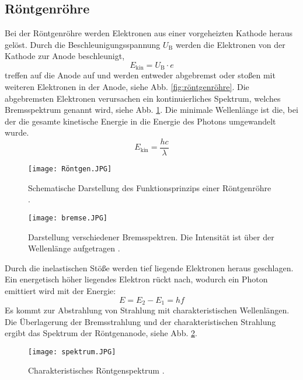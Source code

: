 \subsection{Röntgenröhre}
Bei der Röntgenröhre werden Elektronen aus einer vorgeheizten Kathode heraus gelöst. Durch die Beschleunigungsspannung $U_\text{B}$ werden die Elektronen von der Kathode zur Anode beschleunigt,
\begin{equation*}E_\text{kin} = U_\text{B} \cdot e\end{equation*}
treffen auf die Anode auf und werden entweder abgebremst oder stoßen mit weiteren Elektronen in der Anode, siehe Abb. \ref{fig:röntgenröhre}.
Die abgebremsten Elektronen verursachen ein kontinuierliches Spektrum, welches Bremsspektrum genannt wird, siehe Abb. \ref{fig:bremsspektrum}. Die minimale Wellenlänge ist die, bei der die gesamte kinetische Energie in die Energie des Photons umgewandelt wurde.
\begin{equation*}E_\text{kin} = \frac{hc}{\lambda}\end{equation*}
\begin{figure}[H]
\begin{minipage}{0.5\textwidth}
    \centering
    \texttt{[image: Röntgen.JPG]}
    \caption[Funktionsprinzip Röntgenröhre]{Schematische Darstellung des Funktionsprinzips einer Röntgenröhre \cite{demtroder3}.}
    \label{fig:röntgenröhre}
\end{minipage}\hfill
\begin{minipage}{0.5\textwidth}
    \centering
    \texttt{[image: bremse.JPG]}
    \caption[Bremsspektren]{Darstellung verschiedener Bremsspektren. Die Intensität ist über der Wellenlänge aufgetragen \cite{demtroder3}.}
    \label{fig:bremsspektrum}
\end{minipage}
\end{figure}
Durch die inelastischen Stöße werden tief liegende Elektronen heraus geschlagen. Ein energetisch höher liegendes Elektron rückt nach, wodurch ein Photon emittiert wird mit der Energie:
\begin{equation*}E = E_2 - E_1 = hf\end{equation*}
Es kommt zur Abstrahlung von Strahlung mit charakteristischen Wellenlängen. Die Überlagerung der Bremsstrahlung und der charakteristischen Strahlung ergibt das Spektrum der Röntgenanode, siehe Abb. \ref{fig:röntgenspektrum}.
\begin{figure}[H]
\centering
    \texttt{[image: spektrum.JPG]}
    \caption[Röntgenspektrum]{Charakteristisches Röntgenspektrum \cite{demtroder3}.}
    \label{fig:röntgenspektrum}
\end{figure}


